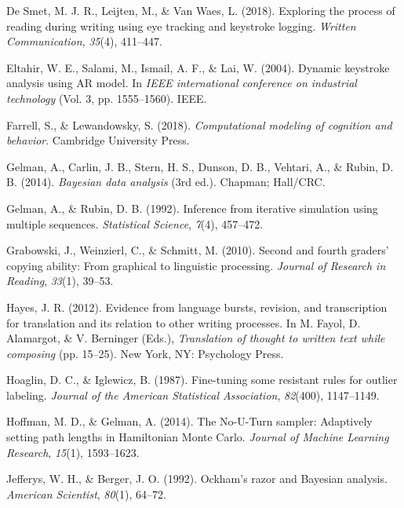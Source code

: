 \documentclass[english,man,floatsintext]{apa7}
\begin{document}
\leavevmode\hypertarget{ref-de2018exploring}{}%
De Smet, M. J. R., Leijten, M., \& Van Waes, L. (2018). Exploring the process of reading during writing using eye tracking and keystroke logging. \emph{Written Communication}, \emph{35}(4), 411--447.

\leavevmode\hypertarget{ref-eltahir2004dynamic}{}%
Eltahir, W. E., Salami, M., Ismail, A. F., \& Lai, W. (2004). Dynamic keystroke analysis using AR model. In \emph{IEEE international conference on industrial technology} (Vol. 3, pp. 1555--1560). IEEE.

\leavevmode\hypertarget{ref-farrell2018computational}{}%
Farrell, S., \& Lewandowsky, S. (2018). \emph{Computational modeling of cognition and behavior}. Cambridge University Press.

\leavevmode\hypertarget{ref-gelman2014}{}%
Gelman, A., Carlin, J. B., Stern, H. S., Dunson, D. B., Vehtari, A., \& Rubin, D. B. (2014). \emph{Bayesian data analysis} (3rd ed.). Chapman; Hall/CRC.

\leavevmode\hypertarget{ref-gelman1992}{}%
Gelman, A., \& Rubin, D. B. (1992). Inference from iterative simulation using multiple sequences. \emph{Statistical Science}, \emph{7}(4), 457--472.

\leavevmode\hypertarget{ref-grabowski2010second}{}%
Grabowski, J., Weinzierl, C., \& Schmitt, M. (2010). Second and fourth graders' copying ability: From graphical to linguistic processing. \emph{Journal of Research in Reading}, \emph{33}(1), 39--53.

\leavevmode\hypertarget{ref-hayes2012evidence}{}%
Hayes, J. R. (2012). Evidence from language bursts, revision, and transcription for translation and its relation to other writing processes. In M. Fayol, D. Alamargot, \& V. Berninger (Eds.), \emph{Translation of thought to written text while composing} (pp. 15--25). New York, NY: Psychology Press.

\leavevmode\hypertarget{ref-hoaglin1987fine}{}%
Hoaglin, D. C., \& Iglewicz, B. (1987). Fine-tuning some resistant rules for outlier labeling. \emph{Journal of the American Statistical Association}, \emph{82}(400), 1147--1149.

\leavevmode\hypertarget{ref-hoffman2014no}{}%
Hoffman, M. D., \& Gelman, A. (2014). The No-U-Turn sampler: Adaptively setting path lengths in Hamiltonian Monte Carlo. \emph{Journal of Machine Learning Research}, \emph{15}(1), 1593--1623.

\leavevmode\hypertarget{ref-jefferys1992ockham}{}%
Jefferys, W. H., \& Berger, J. O. (1992). Ockham's razor and Bayesian analysis. \emph{American Scientist}, \emph{80}(1), 64--72.
\end{document}
